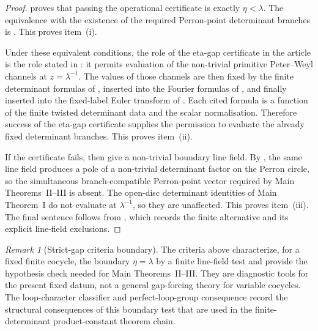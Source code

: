 \documentclass[11pt,a4paper]{amsart}
\theoremstyle{plain}
\theoremstyle{definition}
\theoremstyle{remark}
\newtheorem{remark}[theorem]{Remark}
\begin{document}
\begin{proof}
   proves that passing the
  operational certificate is exactly \(\eta<\lambda\).  The equivalence with
  the existence of the required Perron-point determinant branches is
  .  This proves item~(i).

  Under these equivalent conditions, the role of the eta-gap certificate in
  the article is the role stated in
  : it permits
  evaluation of the non-trivial primitive Peter--Weyl channels at
  \(z=\lambda^{-1}\).  The values of those channels are then fixed by the
  finite determinant formulas of
  ,
  inserted into the Fourier formulas of
  , and finally
  inserted into the fixed-label Euler transform of
  .
  Each cited formula is a function of the finite twisted determinant data and
  the scalar normalisation.  Therefore success of the eta-gap certificate
  supplies the permission to evaluate the already fixed determinant branches.
  This proves item~(ii).

  If the certificate fails, then
   give a
  non-trivial boundary line field.  By
  , the same line field produces a pole of
  a non-trivial determinant factor on the Perron circle, so the simultaneous
  branch-compatible Perron-point vector required by Main Theorems~II--III is
  absent.  The open-disc determinant
  identities of Main Theorem~I do not evaluate at \(\lambda^{-1}\), so they are
  unaffected.  This proves item~(iii).  The final sentence follows from
  , which records the finite alternative
  and its explicit line-field exclusions.
\end{proof}

\begin{remark}[Strict-gap criteria boundary]
  \label{prop:eta-gap-conditional-scope}
  \label{rem:eta-gap-criteria-scope}
  \label{rem:eta-gap-criteria-boundary-note}
  The criteria above characterize, for a fixed finite cocycle, the boundary
  \(\eta=\lambda\) by a
  finite line-field test and provide the hypothesis check needed for
  Main Theorems~II--III.  They are diagnostic tools for the present fixed
  datum, not a general gap-forcing theory for variable cocycles.  The
  loop-character classifier
   and perfect-loop-group
  consequence  record the structural
  consequences of this boundary test that are used in the finite-determinant
  product-constant theorem chain.
\end{remark}
\end{document}
